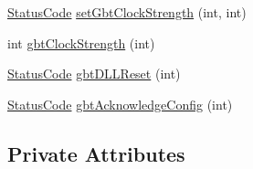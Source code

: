 \begin{DoxyCompactItemize}
\item 
\hyperlink{classStatusCode}{Status\+Code} \hyperlink{classFEB__v1_a717d56186e6221cb20397cc3e496da50}{set\+Gbt\+Clock\+Strength} (int, int)
\item 
int \hyperlink{classFEB__v1_a6ca15de02d32e38a0fc90ad29302072e}{gbt\+Clock\+Strength} (int)
\item 
\hyperlink{classStatusCode}{Status\+Code} \hyperlink{classFEB__v1_a79b299ce9b36b51916103371aef027df}{gbt\+D\+L\+L\+Reset} (int)
\item 
\hyperlink{classStatusCode}{Status\+Code} \hyperlink{classFEB__v1_af7e7f3cb7269dc811866bc42585cf020}{gbt\+Acknowledge\+Config} (int)
\end{DoxyCompactItemize}
\subsection*{Private Attributes}
